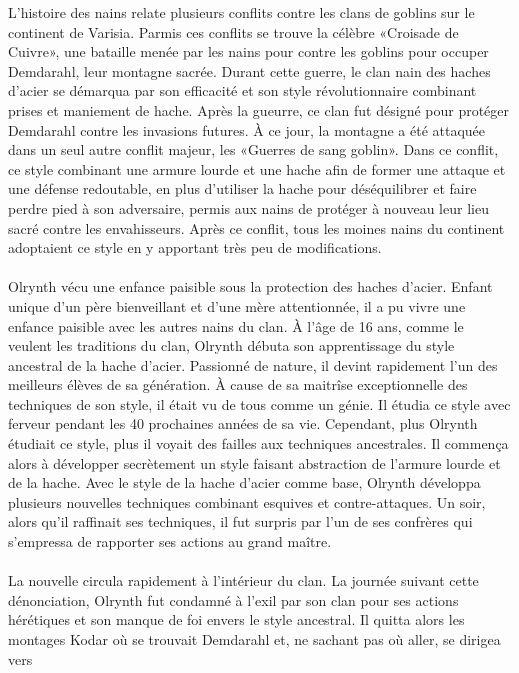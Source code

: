 \documentclass[main.tex]{subfiles}
\begin{document}
    L'histoire des nains relate plusieurs conflits contre les clans de goblins sur le continent de Varisia.
    Parmis ces conflits se trouve la célèbre «Croisade de Cuivre», une bataille menée par les nains pour contre
    les goblins pour occuper Demdarahl, leur montagne sacrée. Durant cette guerre, le clan nain des haches 
    d'acier se démarqua par son efficacité et son style révolutionnaire combinant prises et maniement de hache.
    Après la gueurre, ce clan fut désigné pour protéger Demdarahl contre les invasions futures. À ce jour, la 
    montagne a été attaquée dans un seul autre conflit majeur, les «Guerres de sang goblin». Dans ce conflit, 
    ce style combinant une armure lourde et une hache afin de former une attaque et une défense redoutable, 
    en plus d'utiliser la hache pour déséquilibrer et faire perdre pied à son adversaire, permis aux nains de 
    protéger à nouveau leur lieu sacré contre les envahisseurs. Après ce conflit, tous les moines nains du 
    continent adoptaient ce style en y apportant très peu de modifications. \\
    \\
    Olrynth vécu une enfance paisible sous la protection des haches d'acier.
    Enfant unique d'un père bienveillant et d'une mère attentionnée, il a pu vivre une enfance paisible avec
    les autres nains du clan. À l'âge de 16 ans, comme le veulent les traditions du clan, Olrynth débuta son
    apprentissage du style ancestral de la hache d'acier. Passionné de nature, il devint rapidement l'un des
    meilleurs élèves de sa génération. À cause de sa maitrîse exceptionnelle des techniques de son style, il
    était vu de tous comme un génie. Il étudia ce style avec ferveur pendant les 40 prochaines années de sa vie.
    Cependant, plus Olrynth étudiait ce style, plus il voyait des failles aux techniques ancestrales. 
    Il commença alors à développer secrètement un style faisant abstraction de l'armure lourde et de la hache. 
    Avec le style de la hache d'acier comme base, Olrynth développa plusieurs nouvelles techniques combinant 
    esquives et contre-attaques. Un soir, alors qu'il raffinait ses techniques, il fut surpris par l'un de ses 
    confrères qui s'empressa de rapporter ses actions au grand maître.\\
    \\
    La nouvelle circula rapidement à l'intérieur du clan. La journée suivant cette dénonciation, Olrynth fut
    condamné à l'exil par son clan pour ses actions hérétiques et son manque de foi envers le style ancestral.
    Il quitta alors les montages Kodar où se trouvait Demdarahl et, ne sachant pas où aller, se dirigea vers
\end{document}
